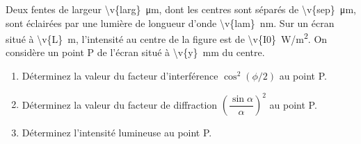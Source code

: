 Deux fentes de largeur \qty{\v{larg}}{\micro\metre}, dont les centres sont séparés de \qty{\v{sep}}{\micro\metre}, sont éclairées par une lumière de longueur d'onde \qty{\v{lam}}{nm}. Sur un écran situé à \qty{\v{L}}{m}, l'intensité au centre de la figure est de \qty{\v{I0}}{W/m^2}. On considère un point P de l'écran situé à \qty{\v{y}}{mm} du centre.

\begin{enumerate}[label=\alph*)]
    \item Déterminez la valeur du facteur d'interférence $\cos^2(\phi/2)$ au point P.
    \item Déterminez la valeur du facteur de diffraction $\left(\dfrac{\sin\alpha}{\alpha}\right)^2$ au point P.
    \item Déterminez l'intensité lumineuse au point P.
\end{enumerate}
